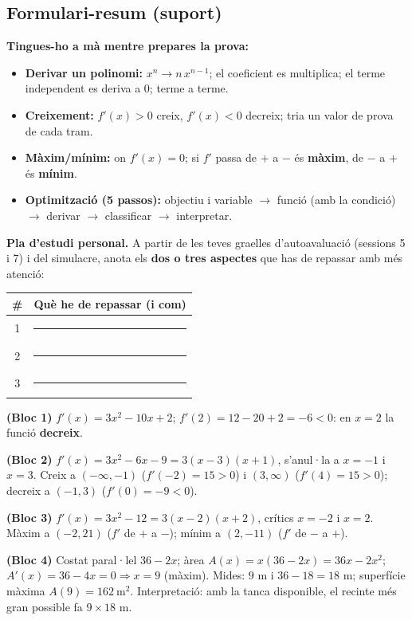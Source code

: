 \subsection{Formulari-resum (suport)}

\begin{idea}
\textbf{Tingues-ho a mà mentre prepares la prova:}
\begin{itemize}[leftmargin=1.4em, itemsep=2pt]
  \item \textbf{Derivar un polinomi:} $x^n\to n\,x^{n-1}$; el coeficient es multiplica;
        el terme independent es deriva a $0$; terme a terme.
  \item \textbf{Creixement:} $f'(x)>0$ creix, $f'(x)<0$ decreix; tria un valor de prova
        de cada tram.
  \item \textbf{Màxim/mínim:} on $f'(x)=0$; si $f'$ passa de $+$ a $-$ és \textbf{màxim},
        de $-$ a $+$ és \textbf{mínim}.
  \item \textbf{Optimització (5 passos):} objectiu i variable $\to$ funció (amb la
        condició) $\to$ derivar $\to$ classificar $\to$ interpretar.
\end{itemize}
\end{idea}

\noindent\textbf{Pla d'estudi personal.} A partir de les teves graelles d'autoavaluació
(sessions 5 i 7) i del simulacre, anota els \textbf{dos o tres aspectes} que has de
repassar amb més atenció:
\begin{center}
\renewcommand{\arraystretch}{1.5}
\begin{tabular}{c p{10.5cm}}
\toprule
\textbf{\#} & \textbf{Què he de repassar (i com)} \\
\midrule
1 & \rule{9.8cm}{0.4pt} \\
2 & \rule{9.8cm}{0.4pt} \\
3 & \rule{9.8cm}{0.4pt} \\
\bottomrule
\end{tabular}
\end{center}

\begin{solucions}
\begin{sollist}
  \item \textbf{(Bloc 1)} $f'(x)=3x^2-10x+2$; $f'(2)=12-20+2=-6<0$: en $x=2$ la funció
        \textbf{decreix}.
  \item \textbf{(Bloc 2)} $f'(x)=3x^2-6x-9=3(x-3)(x+1)$, s'anul·la a $x=-1$ i $x=3$.
        Creix a $(-\infty,-1)$ ($f'(-2)=15>0$) i $(3,\infty)$ ($f'(4)=15>0$); decreix a
        $(-1,3)$ ($f'(0)=-9<0$).
  \item \textbf{(Bloc 3)} $f'(x)=3x^2-12=3(x-2)(x+2)$, crítics $x=-2$ i $x=2$. Màxim a
        $(-2,21)$ ($f'$ de $+$ a $-$); mínim a $(2,-11)$ ($f'$ de $-$ a $+$).
  \item \textbf{(Bloc 4)} Costat paral·lel $36-2x$; àrea $A(x)=x(36-2x)=36x-2x^2$;
        $A'(x)=36-4x=0\Rightarrow x=9$ (màxim). Mides: $9$ m i $36-18=18$ m; superfície
        màxima $A(9)=162\ \text{m}^2$. Interpretació: amb la tanca disponible, el recinte
        més gran possible fa $9\times 18$ m.
\end{sollist}
\end{solucions}
